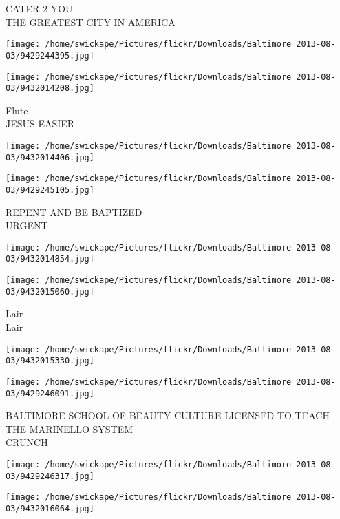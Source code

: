 \documentclass[10pt,letterpaper]{article}
\begin{document}
CATER 2 YOU\\
THE GREATEST CITY IN AMERICA\\
\pagebreak

\texttt{[image: /home/swickape/Pictures/flickr/Downloads/Baltimore 2013-08-03/9429244395.jpg]}

\vspace{0.25in}
\texttt{[image: /home/swickape/Pictures/flickr/Downloads/Baltimore 2013-08-03/9432014208.jpg]}

Flute\\
JESUS EASIER\\
\pagebreak

\texttt{[image: /home/swickape/Pictures/flickr/Downloads/Baltimore 2013-08-03/9432014406.jpg]}

\vspace{0.25in}
\texttt{[image: /home/swickape/Pictures/flickr/Downloads/Baltimore 2013-08-03/9429245105.jpg]}

REPENT AND BE BAPTIZED\\
URGENT\\
\pagebreak

\texttt{[image: /home/swickape/Pictures/flickr/Downloads/Baltimore 2013-08-03/9432014854.jpg]}

\vspace{0.25in}
\texttt{[image: /home/swickape/Pictures/flickr/Downloads/Baltimore 2013-08-03/9432015060.jpg]}

Lair\\
Lair\\
\pagebreak

\texttt{[image: /home/swickape/Pictures/flickr/Downloads/Baltimore 2013-08-03/9432015330.jpg]}

\vspace{0.25in}
\texttt{[image: /home/swickape/Pictures/flickr/Downloads/Baltimore 2013-08-03/9429246091.jpg]}

BALTIMORE SCHOOL OF BEAUTY CULTURE LICENSED TO TEACH THE MARINELLO SYSTEM\\
CRUNCH\\
\pagebreak

\texttt{[image: /home/swickape/Pictures/flickr/Downloads/Baltimore 2013-08-03/9429246317.jpg]}

\vspace{0.25in}
\texttt{[image: /home/swickape/Pictures/flickr/Downloads/Baltimore 2013-08-03/9432016064.jpg]}
\end{document}
